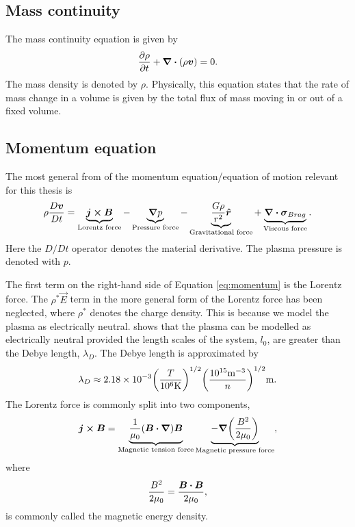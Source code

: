 \subsection{Mass continuity}

The mass continuity equation is given by
\begin{equation}
    \label{eq:mass_continuity}
    \pdv{\rho}{t}+\div(\rho\boldsymbol{v})=0.
\end{equation}
The mass density is denoted by $\rho$. Physically, this equation states that the rate of mass change in a volume is given by the total flux of mass moving in or out of a fixed volume.

\subsection{Momentum equation}
The most general from of the momentum equation/equation of motion relevant for this thesis is
\begin{equation}
    \label{eq:momentum}
    \rho\frac{D\boldsymbol{v}}{Dt}=\underbrace{\boldsymbol{j}\cross\boldsymbol{B}}_{\text{Lorentz force}}-\underbrace{\grad p}_{\text{Pressure force}}-\underbrace{\frac{G\rho}{r^2}\boldsymbol{\hat{r}}}_{\text{Gravitational force}}+\underbrace{\div\boldsymbol{\sigma}_{Brag}}_{\text{Viscous force}}.
\end{equation}
Here the $D/Dt$ operator denotes the material derivative. The plasma pressure is denoted with $p$.

The first term on the right-hand side of Equation \eqref{eq:momentum} is the Lorentz force. The $\rho^*\vec{E}$ term in the more general form of the Lorentz force has been neglected, where $\rho^*$ denotes the charge density. This is because we model the plasma as electrically neutral. \citet{Priest2014} shows that the plasma can be modelled as electrically neutral provided the length scales of the system, $l_0$, are greater than the Debye length, $\lambda_D$. The Debye length is approximated by
\begin{equation}
    \lambda_D\approx2.18\times10^{-3}\qty(\frac{T}{10^6\si{.K}})^{1/2}\qty(\frac{10^{15}\si{.m^{-3}}}{n})^{1/2}\si{.m}.
\end{equation}
The Lorentz force is commonly split into two components,
\begin{equation}
    \vec{j}\cross\vec{B}=\underbrace{\frac{1}{\mu_0}(\vec{B}\vdot\grad)\vec{B}}_{\text{Magnetic tension force}}\underbrace{-\grad\qty(\frac{B^2}{2\mu_0})}_{\text{Magnetic pressure force}},
\end{equation}
where 
\[\frac{B^2}{2\mu_0}=\frac{\vec{B}\vdot\vec{B}}{2\mu_0},\]
is commonly called the magnetic energy density.

